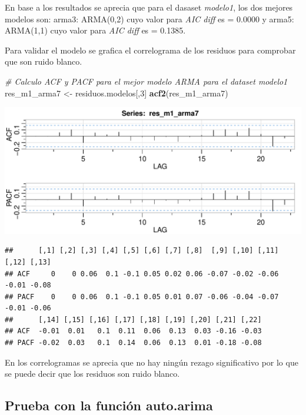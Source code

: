 \documentclass[
  11pt,
]{article}
\newenvironment{Shaded}{\begin{snugshade}}{\end{snugshade}}
\newcommand{\CommentTok}[1]{\textcolor[rgb]{0.56,0.35,0.01}{\textit{#1}}}
\newcommand{\DecValTok}[1]{\textcolor[rgb]{0.00,0.00,0.81}{#1}}
\newcommand{\KeywordTok}[1]{\textcolor[rgb]{0.13,0.29,0.53}{\textbf{#1}}}
\newcommand{\NormalTok}[1]{#1}
\newcommand{\StringTok}[1]{\textcolor[rgb]{0.31,0.60,0.02}{#1}}
\begin{document}
En base a los resultados se aprecia que para el dasaset \emph{modelo1},
los dos mejores modelos son: arma3: ARMA(0,2) cuyo valor para \emph{AIC
diff} es = 0.0000 y arma5: ARMA(1,1) cuyo valor para \emph{AIC diff} es
= 0.1385.

Para validar el modelo se grafica el correlograma de los residuos para
comprobar que son ruido blanco.

\begin{Shaded}
\begin{Highlighting}[]
\CommentTok{# Calculo ACF y PACF para el mejor modelo ARMA para el dataset modelo1}
\NormalTok{res_m1_arma7 <-}\StringTok{ }\NormalTok{residuos.modelos[,}\DecValTok{3}\NormalTok{]}
\KeywordTok{acf2}\NormalTok{(res_m1_arma7)}
\end{Highlighting}
\end{Shaded}

\begin{center}\includegraphics[width=0.9\linewidth]{RmdFigs/acf1_arma3-1} \end{center}

\begin{verbatim}
##      [,1] [,2] [,3] [,4] [,5] [,6] [,7] [,8]  [,9] [,10] [,11] [,12] [,13]
## ACF     0    0 0.06  0.1 -0.1 0.05 0.02 0.06 -0.07 -0.02 -0.06 -0.01 -0.08
## PACF    0    0 0.06  0.1 -0.1 0.05 0.01 0.07 -0.06 -0.04 -0.07 -0.01 -0.06
##      [,14] [,15] [,16] [,17] [,18] [,19] [,20] [,21] [,22]
## ACF  -0.01  0.01   0.1  0.11  0.06  0.13  0.03 -0.16 -0.03
## PACF -0.02  0.03   0.1  0.14  0.06  0.13  0.01 -0.18 -0.08
\end{verbatim}

En los correlogramas se aprecia que no hay ningún rezago significativo
por lo que se puede decir que los residuos son ruido blanco.

\hypertarget{prueba-con-la-funciuxf3n-auto.arima}{%
\subsection{Prueba con la función
auto.arima}\label{prueba-con-la-funciuxf3n-auto.arima}}
\end{document}
